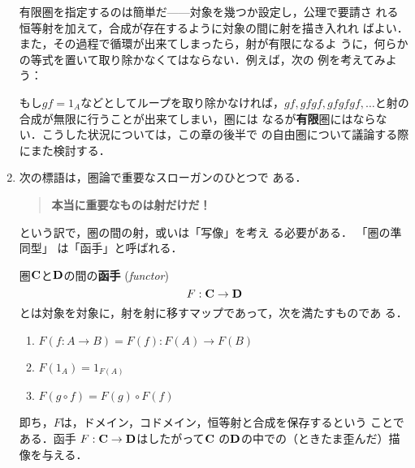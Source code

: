 \begin{enumerate}
       有限圏を指定するのは簡単だ------対象を幾つか設定し，公理で要請さ
       れる恒等射を加えて，合成が存在するように対象の間に射を描き入れれ
       ばよい．また，その過程で循環が出来てしまったら，射が有限になるよ
       うに，何らかの等式を置いて取り除かなくてはならない．例えば，次の
       例を考えてみよう：
       \begin{center}
       \end{center}
       もし$gf=1_A$などとしてループを取り除かなければ，$gf,
       gfgf,gfgfgf,\ldots$と射の合成が無限に行うことが出来てしまい，圏には
       なるが{\bfseries 有限}圏にはならない．こうした状況については，この章の後半で
       の自由圏について議論する際にまた検討する．
 \item 次の標語は，圏論で重要なスローガンのひとつで
       ある．
       \begin{quote}
	{\bfseries 本当に重要なものは射だけだ！}
       \end{quote}
       という訳で，圏の間の射，或いは「写像」を考え
       る必要がある．
       「圏の準同型」
       は「函手」と呼ばれる．
       \begin{definition}
	圏${\bf C}$と${\bf D}$の間の{\bfseries 函手}
	({\itshape functor})
	\[
	 F : {\bf C} \to {\bf D}
	\]
	とは対象を対象に，射を射に移すマップであって，次を満たすものであ
	る．
	\begin{enumerate}
	 \renewcommand{\labelenumi}{(\alph{enumi})}
	 \item $F(f:A \to B) = F(f) : F(A) \to F(B)$
	 \item $F(1_A) = 1_{F(A)}$
	 \item $F(g \circ f) = F(g) \circ F(f)$
	\end{enumerate}
       \end{definition}
       即ち，$F$は，ドメイン，コドメイン，恒等射と合成を保存するという
       ことである．函手 $F : {\bf C} \to {\bf D}$はしたがって${\bf C}$
       の${\bf D}$の中での（ときたま歪んだ）描像を与える．
       \begin{center}
\end{center}
\end{enumerate}

